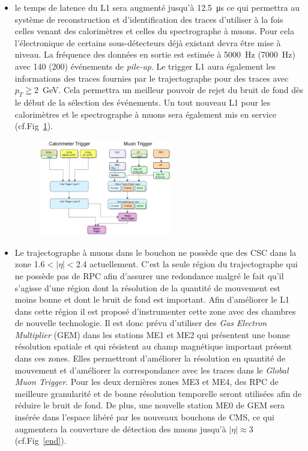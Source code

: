 \begin{itemize}[label=$\bullet$]
	\item le temps de latence du L1 sera augmenté jusqu'à \SI{12.5}{\micro\second} ce qui permettra au système de reconstruction et d'identification des traces d'utiliser à la fois celles venant des calorimètres et celles du spectrographe à muons. Pour cela l'électronique de certains sous-détecteurs déjà existant devra être mise à niveau. La fréquence des données en sortie est estimée à \SI{5000}{\hertz} (\SI{7000}{\hertz}) avec \num{140} (\num{200}) événements de \textit{pile-up}. Le trigger L1 aura également les informations des traces fournies par le trajectographe pour des traces avec $p_{T}\geqq$\SI{2}{\giga\eV}. Cela permettra un meilleur pouvoir de rejet du bruit de fond dès le début de la sélection des événements. Un tout nouveau L1 pour les calorimètres et le spectrographe à muons sera également mis en service (cf.Fig~\ref{L1_2}).
	\begin{figure}[ht!]
		\centering
		\includegraphics[width=0.55\textwidth]{CMS/L1_2.png}
		\label{L1_2}
	\end{figure}
\item Le trajectographe à muons dans le bouchon ne possède que des CSC dans la zone \num{1.6}$<|\eta|<$\num{2.4} actuellement. C'est la seule région du trajectographe qui ne possède pas de RPC afin d'assurer une redondance malgré le fait qu'il s'agisse d'une région dont la résolution de la quantité de mouvement est moins bonne et dont le bruit de fond est important. Afin d'améliorer le L1 dans cette région il est proposé d'instrumenter cette zone avec des chambres de nouvelle technologie. Il est donc prévu d'utiliser des \textit{Gas Electron Multiplier} (GEM) dans les stations ME1 et ME2 qui présentent une bonne résolution spatiale et qui résistent au champ magnétique important présent dans ces zones. Elles permettront d'améliorer la résolution en quantité de mouvement et d'améliorer la correspondance avec les traces dans le \textit{Global Muon Trigger}. Pour les deux dernières zones ME3 et ME4, des RPC de meilleure granularité et de bonne résolution temporelle seront utilisées afin de réduire le bruit de fond.  De plus, une nouvelle station ME0 de GEM sera insérée dans l'espace libéré par les nouveaux bouchons de CMS, ce qui augmentera la couverture de détection des muons jusqu'à $|\eta|\approx$\num{3} (cf.Fig~\ref{end}). 

\end{itemize}
